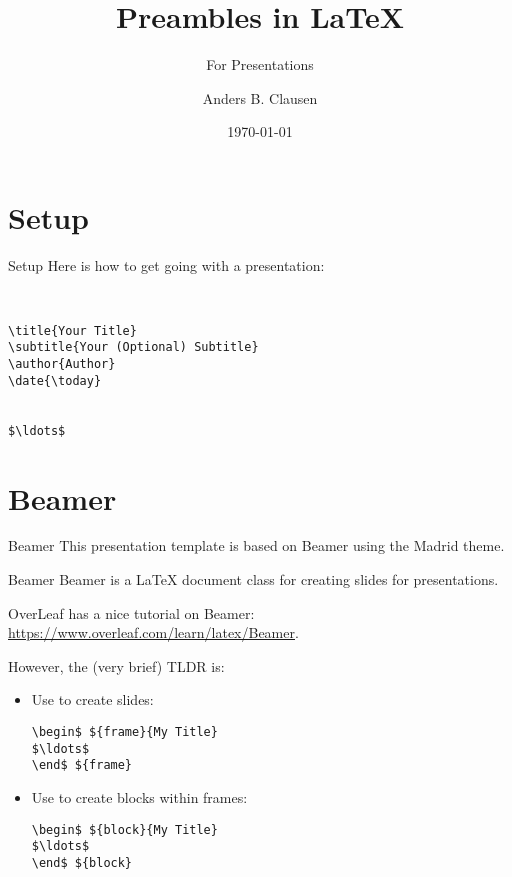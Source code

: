 


\title{Preambles in \LaTeX}
\subtitle{For Presentations}
\author{Anders B. Clausen}
\date{\today}



\frame{
  \tableofcontents
}

\section{Setup}
\begin{frame}[fragile]{Setup}
  Here is how to get going with a presentation:
  \begin{lstlisting}[language=MyTeX]


\title{Your Title}
\subtitle{Your (Optional) Subtitle}
\author{Author}
\date{\today}


$\ldots$
\end{lstlisting}
\end{frame}

\section{Beamer}
\begin{frame}[fragile]{Beamer}
  This presentation template is based on Beamer using the Madrid theme.
  \begin{block}{Beamer}
    Beamer is a \LaTeX{} document class for creating slides for presentations.

    OverLeaf has a nice tutorial on Beamer: \url{https://www.overleaf.com/learn/latex/Beamer}.
  \end{block}
  However, the (very brief) TLDR is:
  \begin{itemize}
    \item Use  to create slides:
    \begin{lstlisting}[language=MyTex]
\begin$ ${frame}{My Title}
$\ldots$
\end$ ${frame}\end{lstlisting}
    \item Use  to create blocks within frames: 
    \begin{lstlisting}[language=MyTex]
\begin$ ${block}{My Title}
$\ldots$
\end$ ${block}\end{lstlisting}
  \end{itemize}
\end{frame}

